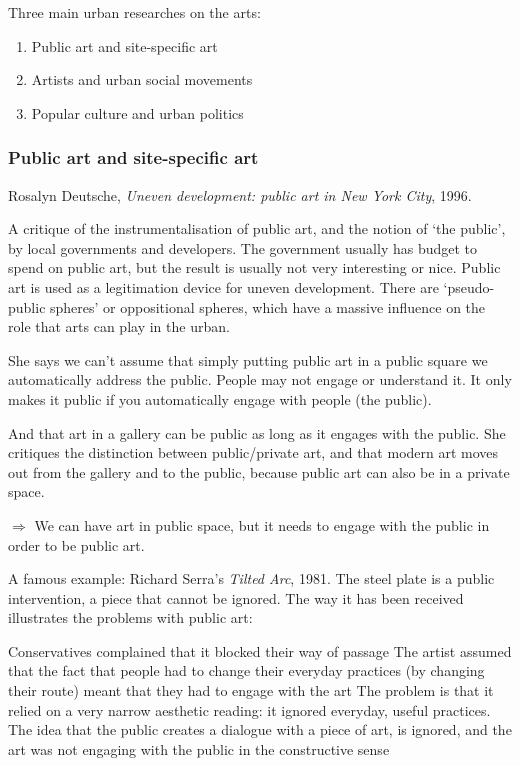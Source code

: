 \documentclass{article}
\begin{document}
Three main urban researches on the arts: 

\begin{enumerate}
	\item Public art and site-specific art
	\item Artists and urban social movements
	\item Popular culture and urban politics
\end{enumerate}

\subsubsection{Public art and site-specific art}

Rosalyn Deutsche, \textit{Uneven development: public art in New York City}, 1996.

A critique of the instrumentalisation of public art, and the notion of `the public', by local governments and developers. The government usually has budget to spend on public art, but the result is usually not very interesting or nice. Public art is used as a legitimation device for uneven development. There are `pseudo-public spheres' or oppositional spheres, which have a massive influence on the role that arts  can play in the urban.

She says we can't assume that simply putting public art in a public square we automatically address the public. People may not engage or understand it. It only makes it public if you automatically engage with people (the public). 

And that art in a gallery can be public as long as it engages with the public. She critiques the distinction between public/private art, and that modern art moves out from the gallery and to the public, because public art can also be in a private space. 

$\Rightarrow$ We can have art in public space, but it needs to engage with the public in order to be public art.

A famous example: Richard Serra's \textit{Tilted Arc}, 1981. The steel plate is a public intervention, a piece that cannot be ignored. The way it has been received illustrates the problems with public art:

\begin{outline}
	\1 Conservatives complained that it blocked their way of passage
	\1 The artist assumed that the fact that people had to change their everyday practices (by changing their route) meant that they had to engage with the art
	\1 The problem is that it relied on a very narrow aesthetic reading: it ignored everyday, useful practices. The idea that the public creates a dialogue with a piece of art, is ignored, and the art was not engaging with the public in the constructive sense
\end{outline}
\end{document}

